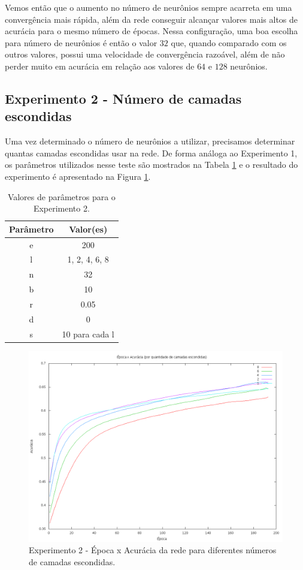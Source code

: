 \documentclass[12pt]{article}
\begin{document}
Vemos então que o aumento no número de neurônios sempre acarreta em uma
convergência mais rápida, além da rede conseguir alcançar valores mais
altos de acurácia para o mesmo número de épocas. Nessa configuração,
uma boa escolha para número de neurônios é então o valor $ 32 $ que,
quando comparado com os outros valores, possui uma velocidade de
convergência razoável, além de não perder muito em acurácia em relação
aos valores de $ 64 $ e $ 128 $ neurônios.

\subsection{Experimento 2 - Número de camadas escondidas}

Uma vez determinado o número de neurônios a utilizar, precisamos
determinar quantas camadas escondidas usar na rede. De forma análoga
ao Experimento 1, os parâmetros utilizados nesse teste são mostrados
na Tabela \ref{tab:exp2} e o resultado do experimento é apresentado
na Figura \ref{fig:exp2}.

\begin{table}[h]
	\centering
	\begin{tabular}{|c|c|}
		\hline
		\textbf{Parâmetro} & \textbf{Valor(es)} \\ \hline
		e & 200 \\ \hline
		l & 1, 2, 4, 6, 8 \\ \hline
		n & 32 \\ \hline
		b & 10 \\ \hline
		r & 0.05 \\ \hline
		d & 0 \\ \hline
		s & 10 para cada l \\ \hline
	\end{tabular}
	\caption{\label{tab:exp2} Valores de parâmetros para o Experimento
	2.}
\end{table}

\begin{figure}[h]
  \centering
  \includegraphics[width=1\textwidth]{../tests/2-layers/graph.png}
  \caption{Experimento 2 - Época x Acurácia da rede para diferentes
  números de camadas escondidas.}
  \label{fig:exp2}
\end{figure}
\end{document}
